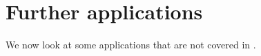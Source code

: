 
\section{Further applications} %
\label{sec:further_applications}

    We now look at some applications that are not covered in \cite{Toen:2005wxa}.




